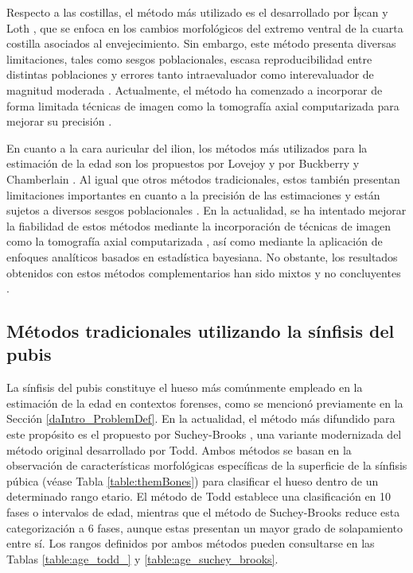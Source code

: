 Respecto a las costillas, el método más utilizado es el desarrollado por İșcan y Loth \cite{icscan1984age, icscan1985age}, que se enfoca en los cambios morfológicos del extremo ventral de la cuarta costilla asociados al envejecimiento. Sin embargo, este método presenta diversas limitaciones, tales como sesgos poblacionales, escasa reproducibilidad entre distintas poblaciones y errores tanto intraevaluador como interevaluador de magnitud moderada \cite{fanton2010critical, hartnett2010analysis}. Actualmente, el método ha comenzado a incorporar de forma limitada técnicas de imagen como la tomografía axial computarizada para mejorar su precisión \cite{blaszkowska2019validation}.

En cuanto a la cara auricular del ilion, los métodos más utilizados para la estimación de la edad son los propuestos por Lovejoy \cite{lovejoy1985chronological} y por Buckberry y Chamberlain \cite{buckberry_age_2002}. Al igual que otros métodos tradicionales, estos también presentan limitaciones importantes en cuanto a la precisión de las estimaciones y están sujetos a diversos sesgos poblacionales \cite{falys2006auricular, michopoulou2017auricular}. En la actualidad, se ha intentado mejorar la fiabilidad de estos métodos mediante la incorporación de técnicas de imagen como la tomografía axial computarizada \cite{villa2013reliability, barrier2009age}, así como mediante la aplicación de enfoques analíticos basados en estadística bayesiana. No obstante, los resultados obtenidos con estos métodos complementarios han sido mixtos y no concluyentes \cite{nikita2018evaluation}.

\subsection{Métodos tradicionales utilizando la sínfisis del pubis}

La sínfisis del pubis constituye el hueso más comúnmente empleado en la estimación de la edad en contextos forenses, como se mencionó previamente en la Sección \ref{daIntro_ProblemDef}. En la actualidad, el método más difundido para este propósito es el propuesto por Suchey-Brooks \cite{RefWorks:RefID:20-brooks1990skeletal}, una variante modernizada del método original desarrollado por Todd. Ambos métodos se basan en la observación de características morfológicas específicas de la superficie de la sínfisis púbica (véase Tabla \ref{table:themBones}) para clasificar el hueso dentro de un determinado rango etario. El método de Todd establece una clasificación en 10 fases o intervalos de edad, mientras que el método de Suchey-Brooks reduce esta categorización a 6 fases, aunque estas presentan un mayor grado de solapamiento entre sí. Los rangos definidos por ambos métodos pueden consultarse en las Tablas \ref{table:age_todd_} y \ref{table:age_suchey_brooks}.

